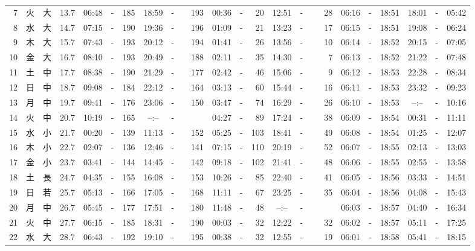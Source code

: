 \documentclass[12pt,a4j]{jsarticle}
\begin{document}
\begin{table}[htbp]
\begin{center}
{\begin{tabular}{|rc|cr|ccrccr|ccrccr|ccc|ccc|}
 7 & 火 & 大 & 13.7 &  06:48 &-& 185 &  18:59 &-& 193 &  00:36 &-&  20 &  12:51 &-&  28 & 06:16 & -& 18:51 & 18:01 & -& 05:42 \\
 8 & 水 & 大 & 14.7 &  07:15 &-& 190 &  19:36 &-& 196 &  01:09 &-&  21 &  13:23 &-&  17 & 06:15 & -& 18:51 & 19:08 & -& 06:24 \\
 9 & 木 & 大 & 15.7 &  07:43 &-& 193 &  20:12 &-& 194 &  01:41 &-&  26 &  13:56 &-&  10 & 06:14 & -& 18:52 & 20:15 & -& 07:05 \\
10 & 金 & 大 & 16.7 &  08:10 &-& 193 &  20:49 &-& 188 &  02:11 &-&  35 &  14:30 &-&   7 & 06:13 & -& 18:52 & 21:22 & -& 07:48 \\
11 & 土 & 中 & 17.7 &  08:38 &-& 190 &  21:29 &-& 177 &  02:42 &-&  46 &  15:06 &-&   9 & 06:12 & -& 18:53 & 22:28 & -& 08:34 \\
12 & 日 & 中 & 18.7 &  09:08 &-& 184 &  22:12 &-& 164 &  03:13 &-&  60 &  15:44 &-&  16 & 06:11 & -& 18:53 & 23:32 & -& 09:23 \\
13 & 月 & 中 & 19.7 &  09:41 &-& 176 &  23:06 &-& 150 &  03:47 &-&  74 &  16:29 &-&  26 & 06:10 & -& 18:53 & --:-- & -& 10:16 \\
14 & 火 & 中 & 20.7 &  10:19 &-& 165 &  --:-- &-&~~~~~ &  04:27 &-&  89 &  17:24 &-&  38 & 06:09 & -& 18:54 & 00:31 & -& 11:11 \\
15 & 水 & 小 & 21.7 &  00:20 &-& 139 &  11:13 &-& 152 &  05:25 &-& 103 &  18:41 &-&  49 & 06:08 & -& 18:54 & 01:25 & -& 12:07 \\
16 & 木 & 小 & 22.7 &  02:07 &-& 136 &  12:46 &-& 141 &  07:15 &-& 110 &  20:19 &-&  52 & 06:07 & -& 18:55 & 02:13 & -& 13:03 \\
17 & 金 & 小 & 23.7 &  03:41 &-& 144 &  14:45 &-& 142 &  09:18 &-& 102 &  21:41 &-&  48 & 06:06 & -& 18:55 & 02:55 & -& 13:58 \\
18 & 土 & 長 & 24.7 &  04:35 &-& 155 &  16:08 &-& 153 &  10:26 &-&  85 &  22:40 &-&  41 & 06:05 & -& 18:56 & 03:33 & -& 14:51 \\
19 & 日 & 若 & 25.7 &  05:13 &-& 166 &  17:05 &-& 168 &  11:11 &-&  67 &  23:25 &-&  35 & 06:04 & -& 18:56 & 04:08 & -& 15:43 \\
20 & 月 & 中 & 26.7 &  05:45 &-& 177 &  17:51 &-& 180 &  11:48 &-&  48 &  --:-- &-&~~~~~ & 06:03 & -& 18:57 & 04:40 & -& 16:34 \\
21 & 火 & 中 & 27.7 &  06:15 &-& 185 &  18:31 &-& 190 &  00:03 &-&  32 &  12:22 &-&  32 & 06:02 & -& 18:57 & 05:11 & -& 17:25 \\
22 & 水 & 大 & 28.7 &  06:43 &-& 192 &  19:10 &-& 195 &  00:38 &-&  32 &  12:55 &-&  19 & 06:01 & -& 18:58 & 05:41 & -& 18:15 \\

\end{tabular}}
\end{center}
\end{table}
\end{document}
